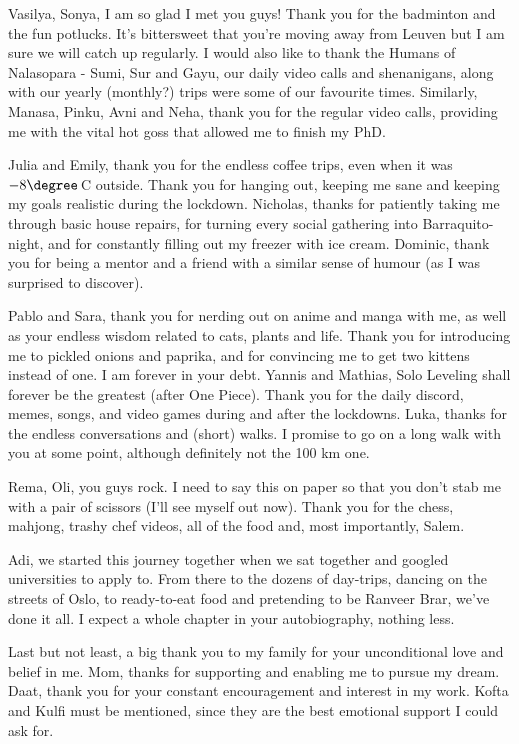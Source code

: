 Vasilya, Sonya, I am so glad I met you guys! Thank you for the badminton and the fun potlucks. It's bittersweet that you're moving away from Leuven but I am sure we will catch up regularly. I would also like to thank the Humans of Nalasopara - Sumi, Sur and Gayu, our daily video calls and shenanigans, along with our yearly (monthly?) trips were some of our favourite times. Similarly, Manasa, Pinku, Avni and Neha, thank you for the regular video calls, providing me with the vital hot goss that allowed me to finish my PhD.

Julia and Emily, thank you for the endless coffee trips, even when it was $-8\degree$\,C outside. Thank you for hanging out, keeping me sane and keeping my goals realistic during the lockdown. Nicholas, thanks for patiently taking me through basic house repairs, for turning every social gathering into Barraquito-night, and for constantly filling out my freezer with ice cream. Dominic, thank you for being a mentor and a friend with a similar sense of humour (as I was surprised to discover).

Pablo and Sara, thank you for nerding out on anime and manga with me, as well as your endless wisdom related to cats, plants and life. Thank you for introducing me to pickled onions and paprika, and for convincing me to get two kittens instead of one. I am forever in your debt. Yannis and Mathias, Solo Leveling shall forever be the greatest (after One Piece). Thank you for the daily discord, memes, songs, and video games during and after the lockdowns. Luka, thanks for the endless conversations and (short) walks. I promise to go on a long walk with you at some point, although definitely not the 100 km one.

Rema, Oli, you guys rock. I need to say this on paper so that you don't stab me with a pair of scissors (I'll see myself out now). Thank you for the chess, mahjong, trashy chef videos, all of the food and, most importantly, Salem.

Adi, we started this journey together when we sat together and googled universities to apply to. From there to the dozens of day-trips, dancing on the streets of Oslo, to ready-to-eat food and pretending to be Ranveer Brar, we've done it all. I expect a whole chapter in your autobiography, nothing less.

Last but not least, a big thank you to my family for your unconditional love and belief in me. Mom, thanks for supporting and enabling me to pursue my dream. Daat, thank you for your constant encouragement and interest in my work. Kofta and Kulfi must be mentioned, since they are the best emotional support I could ask for.

